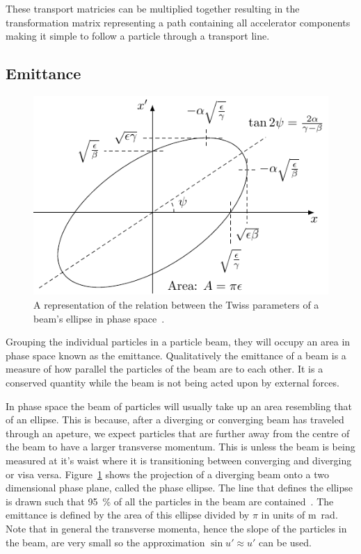 These transport matricies can be multiplied together resulting in the
transformation matrix representing a path containing all accelerator components
making it simple to follow a particle through a transport line.

\subsection{Emittance}

\begin{figure}
	\centering
	\includegraphics{figures/ellipse}
	\caption{
		A representation of the relation between the Twiss parameters of
		a beam's ellipse in phase space~\cite{wiedemann2007particle}.}
	\label{fig:ellipse}
\end{figure}

Grouping the individual particles in a particle beam, they will occupy an area
in phase space known as the emittance.  Qualitatively the emittance of a beam is
a measure of how parallel the particles of the beam are to each other. It is a
conserved quantity while the beam is not being acted upon by external forces.

In phase space the beam of particles will usually take up an area resembling
that of an ellipse. This is because, after a diverging or converging beam has
traveled through an apeture, we expect particles that are further away from the
centre of the beam to have a larger transverse momentum. This is unless the beam
is being measured at it's waist where it is transitioning between converging and
diverging or visa versa. Figure~\ref{fig:ellipse} shows the projection of a
diverging beam onto a two dimensional phase plane, called the phase ellipse.
The line that defines the ellipse is drawn such that \SI{95}{\percent} of all
the particles in the beam are contained~\cite{buon1994beam}. The emittance is
defined by the area of this ellipse divided by \(\pi\) in units of
\si{\meter\radian}. Note that in general the transverse momenta, hence the slope
of the particles in the beam, are very small so the approximation \(\sin
u'\approx u'\) can be used.

